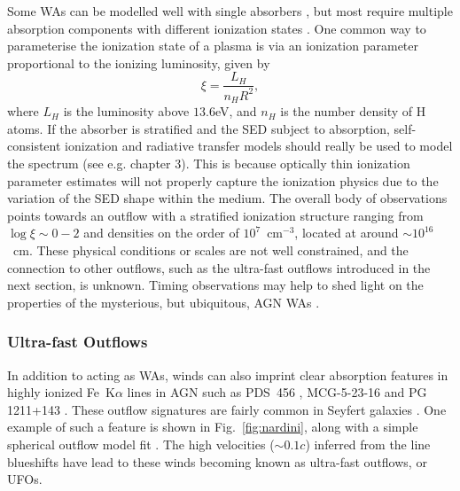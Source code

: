 Some WAs can be modelled well with single absorbers \citep{kaastra2000}, 
but most require multiple absorption components with different ionization states
\citep[e.g.][]{kriss1996,orr1997,krolikkriss2001,connolly2014}.
One common way to parameterise the ionization state of a plasma is 
via an ionization parameter proportional to the ionizing luminosity, 
given by \citep[e.g.][]{reynolds1995}
\begin{equation}
\xi = \frac{L_{H}}{n_H R^2},
\label{eq:xi}
\end{equation}
where $L_H$ is the luminosity above $13.6$eV, and $n_H$ is the number
density of H atoms. If the absorber is stratified and the SED subject to absorption, 
self-consistent ionization and radiative transfer models
should really be used to model the spectrum (see e.g. chapter 3). This is 
because optically thin ionization parameter estimates will not properly capture 
the ionization physics due to the variation of the SED shape within the medium.
The overall body of observations points towards an outflow with a 
stratified ionization structure ranging from $\log \xi \sim 0-2$
and densities on the order of $10^7$~cm$^{-3}$, located at around $\sim10^{16}$~cm. 
These physical conditions or scales are not well constrained, and the connection to 
other outflows, such as the ultra-fast outflows introduced in the next section, 
is unknown. Timing observations may help to shed light on 
the properties of the mysterious, but ubiquitous, 
AGN WAs \citep{silva2015}.

\subsubsection{Ultra-fast Outflows}
\label{sec:ufos}

In addition to acting as WAs, winds can also imprint clear absorption features
in highly ionized Fe~K$\alpha$ lines in AGN such as PDS~456 
\citep{reeves2003, gofford2014,matzeu2016},
MCG-5-23-16 \citep{braito2007} and PG 1211+143 \citep{poundsreeves2009,fukumura2015}.
These outflow signatures are fairly common in Seyfert galaxies \citep{tombesi2010a, gofford2013}. 
One example of such a feature is shown in 
Fig.~\ref{fig:nardini}, along with a simple spherical outflow model fit 
\citep{nardini2015}. The high velocities ($\sim0.1c$) inferred 
from the line blueshifts have lead to these winds becoming known as 
ultra-fast outflows, or UFOs. 

